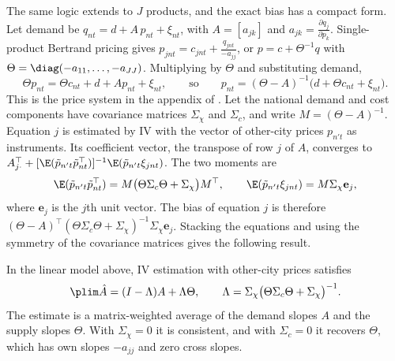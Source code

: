 The same logic extends to $J$ products, and the exact bias has a compact form. Let demand be
$q_{nt} = d + A\,p_{nt} + \xi_{nt}$, with $A = [a_{jk}]$ and $a_{jk} = \frac{\partial q_j}{\partial p_k}$. Single-product
Bertrand pricing gives $p_{jnt} = c_{jnt} + \frac{q_{jnt}}{-a_{jj}}$, or $p = c + \Theta^{-1}q$ with
$\Theta = \diag(-a_{11},\dots,-a_{JJ})$. Multiplying by $\Theta$ and substituting demand,
\begin{equation*}
  \Theta p_{nt} = \Theta c_{nt} + d + Ap_{nt} + \xi_{nt}, \qquad\text{so}\qquad p_{nt} = (\Theta - A)^{-1}\bigl(d + \Theta c_{nt} + \xi_{nt}\bigr).
\end{equation*}
This is the price system in the appendix of \citet{Bresnahan1997}. Let the national demand and cost components
have covariance matrices $\Sigma_\chi$ and $\Sigma_c$, and write $M = (\Theta - A)^{-1}$. Equation $j$ is estimated
by IV with the vector of other-city prices $p_{n't}$ as instruments. Its coefficient vector, the transpose of
row $j$ of $A$, converges to $A_{j\cdot}^\top + [\E(\tilde p_{n't}\tilde p_{nt}^\top)]^{-1}\E(\tilde p_{n't}\xi_{jnt})$.
The two moments are
\begin{equation*}
  \E(\tilde p_{n't}\tilde p_{nt}^\top) = M\bigl(\Theta\Sigma_c\Theta + \Sigma_\chi\bigr)M^\top, \qquad
  \E(\tilde p_{n't}\xi_{jnt}) = M\Sigma_\chi\mathbf{e}_j,
\end{equation*}
where $\mathbf{e}_j$ is the $j$th unit vector. The bias of equation $j$ is therefore
$(\Theta - A)^\top(\Theta\Sigma_c\Theta + \Sigma_\chi)^{-1}\Sigma_\chi\mathbf{e}_j$. Stacking the equations and using the symmetry of
the covariance matrices gives the following result.

\begin{proposition}\label{prop:05-iv-bias}
In the linear model above, IV estimation with other-city prices satisfies
\begin{equation}\label{eq:05-iv-bias}
  \plim\hat A = (I - \Lambda)A + \Lambda\Theta, \qquad \Lambda = \Sigma_\chi\bigl(\Theta\Sigma_c\Theta + \Sigma_\chi\bigr)^{-1}.
\end{equation}
The estimate is a matrix-weighted average of the demand slopes $A$ and the supply slopes $\Theta$. With
$\Sigma_\chi = 0$ it is consistent, and with $\Sigma_c = 0$ it recovers $\Theta$, which has own slopes $-a_{jj}$ and
zero cross slopes.
\end{proposition}

